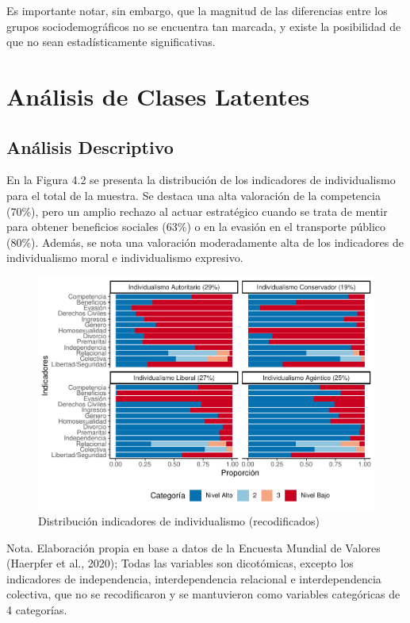 \documentclass[12pt,twoside]{templates/facsothesis}
\begin{document}
Es importante notar, sin embargo, que la magnitud de las diferencias entre los grupos sociodemográficos no se encuentra tan marcada, y existe la posibilidad de que no sean estadísticamente significativas.

\hypertarget{anuxe1lisis-de-clases-latentes-1}{%
\section{Análisis de Clases Latentes}\label{anuxe1lisis-de-clases-latentes-1}}

\hypertarget{anuxe1lisis-descriptivo-1}{%
\subsection{Análisis Descriptivo}\label{anuxe1lisis-descriptivo-1}}

En la Figura 4.2 se presenta la distribución de los indicadores de individualismo para el total de la muestra. Se destaca una alta valoración de la competencia (70\%), pero un amplio rechazo al actuar estratégico cuando se trata de mentir para obtener beneficios sociales (63\%) o en la evasión en el transporte público (80\%). Además, se nota una valoración moderadamente alta de los indicadores de individualismo moral e individualismo expresivo.

\begin{figure}[!ht]

{\centering \includegraphics[width=0.8\linewidth,]{tesis_files/figure-latex/unnamed-chunk-10-1} 

}

\caption{Distribución indicadores de individualismo (recodificados)}\label{fig:unnamed-chunk-10}
\end{figure}
\FloatBarrier

Nota. Elaboración propia en base a datos de la Encuesta Mundial de Valores (Haerpfer et al., 2020); Todas las variables son dicotómicas, excepto los indicadores de independencia, interdependencia relacional e interdependencia colectiva, que no se recodificaron y se mantuvieron como variables categóricas de 4 categorías.
\end{document}
